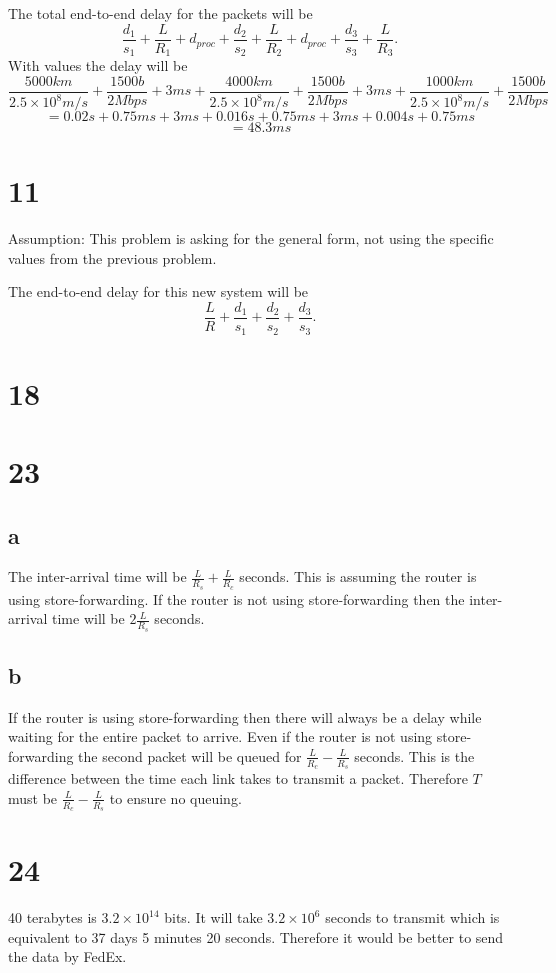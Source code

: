 \documentclass[12pt,letterpaper]{article}
\begin{document}
The total end-to-end delay for the packets will be
$$\frac{d_1}{s_1}+\frac{L}{R_1}+d_{proc}+\frac{d_2}{s_2}+\frac{L}{R_2}+d_{proc}+\frac{d_3}{s_3}+\frac{L}{R_3}.$$
With values the delay will be
$$\frac{5000km}{2.5\times10^8m/s}+\frac{1500b}{2Mbps}+3ms+\frac{4000km}{2.5\times10^8m/s}+\frac{1500b}{2Mbps}+3ms+\frac{1000km}{2.5\times10^8m/s}+\frac{1500b}{2Mbps}$$
$$=0.02s+0.75ms+3ms+0.016s+0.75ms+3ms+0.004s+0.75ms$$
$$=48.3ms$$
\section*{11}

Assumption: This problem is asking for the general form, not using the specific values from the previous problem.

The end-to-end delay for this new system will be
$$\frac{L}{R}+\frac{d_1}{s_1}+\frac{d_2}{s_2}+\frac{d_3}{s_3}.$$
\section*{18}

\section*{23}
\subsection*{a}

The inter-arrival time will be $\frac{L}{R_s}+\frac{L}{R_c}$ seconds.
This is assuming the router is using store-forwarding.
If the router is not using store-forwarding then the inter-arrival time will be $2\frac{L}{R_s}$ seconds.
\subsection*{b}

If the router is using store-forwarding then there will always be a delay while waiting for the entire packet to arrive. Even if the router is not using store-forwarding the second packet will be queued for $\frac{L}{R_c}-\frac{L}{R_s}$ seconds.
This is the difference between the time each link takes to transmit a packet.
Therefore $T$ must be $\frac{L}{R_c}-\frac{L}{R_s}$ to ensure no queuing.
\section*{24}
40 terabytes is $3.2\times10^{14}$ bits.
It will take $3.2\times10^6$ seconds to transmit which is equivalent to 37 days 5 minutes 20 seconds.
Therefore it would be better to send the data by FedEx.
\end{document}
